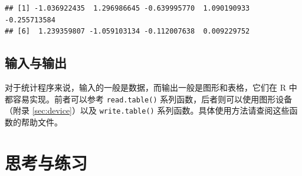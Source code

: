 \documentclass[
  b5paper,
  UTF8,twoside]{book}
\begin{document}
\begin{verbatim}
## [1] -1.036922435  1.296986645 -0.639995770  1.090190933 -0.255713584
## [6]  1.239359807 -1.059103134 -0.112007638  0.009229752
\end{verbatim}

\hypertarget{ux8f93ux5165ux4e0eux8f93ux51fa}{%
\subsection{输入与输出}\label{ux8f93ux5165ux4e0eux8f93ux51fa}}

对于统计程序来说，输入的一般是数据，而输出一般是图形和表格，它们在 R 中都容易实现。前者可以参考 \texttt{read.table()} 系列函数，后者则可以使用图形设备（附录 \ref{sec:device}）以及 \texttt{write.table()} 系列函数。具体使用方法请查阅这些函数的帮助文件。

\hypertarget{ux601dux8003ux4e0eux7ec3ux4e60-7}{%
\section{思考与练习}\label{ux601dux8003ux4e0eux7ec3ux4e60-7}}
\end{document}
